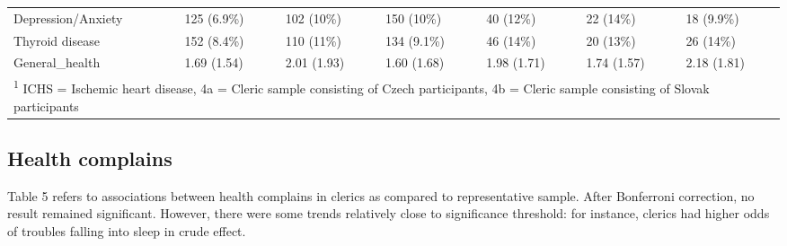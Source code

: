 \documentclass[ijerph,article,accept,moreauthors,pdftex]{mdpi}
\begin{document}
\begin{table}[!h]
{\begin{tabular}[t]{lllllll}
Depression/Anxiety & 125 (6.9\%) & 102 (10\%) & 150 (10\%) & 40 (12\%) & 22 (14\%) & 18 (9.9\%)\\
Thyroid disease & 152 (8.4\%) & 110 (11\%) & 134 (9.1\%) & 46 (14\%) & 20 (13\%) & 26 (14\%)\\
General\_health & 1.69 (1.54) & 2.01 (1.93) & 1.60 (1.68) & 1.98 (1.71) & 1.74 (1.57) & 2.18 (1.81)\\
\bottomrule
\multicolumn{7}{l}{\rule{0pt}{1em}\textsuperscript{1} ICHS = Ischemic heart disease, 4a = Cleric sample consisting of Czech participants, 4b = Cleric sample consisting of Slovak participants}\\
\end{tabular}}
\end{table}

\hypertarget{health-complains-1}{%
\subsection{Health complains}\label{health-complains-1}}

Table 5 refers to associations between health complains in clerics as
compared to representative sample. After Bonferroni correction, no
result remained significant. However, there were some trends relatively
close to significance threshold: for instance, clerics had higher odds
of troubles falling into sleep in crude effect.

\begin{table}[!h]

\caption{\label{tab:Print regres tab 2}Depicts associations (in Odds rations) between living in clerical life and health complains in the last month}
\centering
{}
\end{table}
\end{document}
